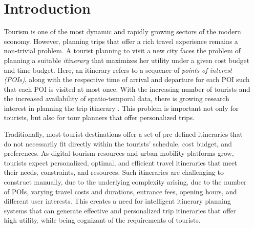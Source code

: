 \section{Introduction}

Tourism is one of the most dynamic and rapidly growing sectors of the modern
economy. However, planning trips that offer a rich travel experience remains a
non-trivial problem. A tourist planning to visit a new city faces the problem of
planning a suitable \emph{itinerary} that maximizes her utility under a given
cost budget and time budget. Here, an itinerary refers to a sequence of
\emph{points of interest (POIs)}, along with the respective time of arrival and
departure for each POI such that each POI is visited at most once. With the
increasing number of tourists and the increased availability of spatio-temporal
data, there is growing research interest in planning the trip itinerary
\citep{li2016travel, gavalas2014survey, sylejmani2011survey}. This problem is
important not only for tourists, but also for tour planners that offer
personalized trips.

Traditionally, most tourist destinations offer a set of pre-defined itineraries
that do not necessarily fit directly within the tourists' schedule, cost budget,
and preferences. As digital tourism resources and urban mobility platforms grow,
tourists expect personalized, optimal, and efficient travel itineraries that
meet their needs, constraints, and resources. Such itineraries are challenging
to construct manually, due to the underlying complexity arising, due to the number
of POIs, varying travel costs and durations, entrance fees, opening hours, and
different user interests. This creates a need for intelligent
itinerary planning systems that can generate effective and personalized trip
itineraries that offer high utility, while being cognizant of the requirements
of tourists.

